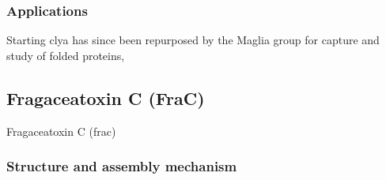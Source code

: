 \subsubsection{Applications}
Starting \gls{clya}  has since been repurposed by the Maglia group for capture and study of folded proteins, 




\subsection{Fragaceatoxin C (FraC)}

Fragaceatoxin C (\gls{frac})

\subsubsection{Structure and assembly mechanism}


